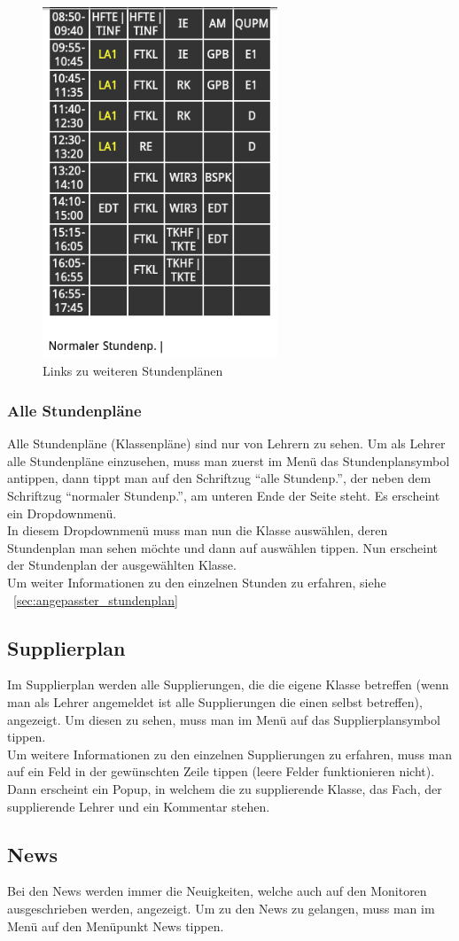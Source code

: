 \begin{figure}[H]
\centering
\includegraphics[keepaspectratio=true, width=7cm]{images/app_instructions/appTimetBottom.png}
\caption{Links zu weiteren Stundenplänen}
\label{fig:App_Timetable_Bottom}
\end{figure}

\subsubsection{Alle Stundenpläne}
Alle Stundenpläne (Klassenpläne) sind nur von Lehrern zu sehen. Um als Lehrer alle Stundenpläne einzusehen, muss man zuerst im Menü das Stundenplansymbol antippen, dann tippt man auf den Schriftzug \enquote{alle Stundenp.}, der neben dem Schriftzug \enquote{normaler Stundenp.}, am unteren Ende der Seite steht. Es erscheint ein Dropdownmenü.\\
In diesem Dropdownmenü muss man nun die Klasse auswählen, deren Stundenplan man sehen möchte und dann auf auswählen tippen. Nun erscheint der Stundenplan der ausgewählten Klasse.\\
Um weiter Informationen zu den einzelnen Stunden zu erfahren, siehe ~\ref{sec:angepasster_stundenplan}

\subsection{Supplierplan}
Im Supplierplan werden alle Supplierungen, die die eigene Klasse betreffen (wenn man als Lehrer angemeldet ist alle Supplierungen die einen selbst betreffen), angezeigt. Um diesen zu sehen, muss man im Menü auf das Supplierplansymbol tippen.\\
Um weitere Informationen zu den einzelnen Supplierungen zu erfahren, muss man auf ein Feld in der gewünschten Zeile tippen (leere Felder funktionieren nicht). Dann erscheint ein Popup, in welchem die zu supplierende Klasse, das Fach, der supplierende Lehrer und ein Kommentar stehen.

\subsection{News}
Bei den News werden immer die Neuigkeiten, welche auch auf den Monitoren ausgeschrieben werden,  angezeigt. Um zu den News zu gelangen, muss man im Menü auf den Menüpunkt News tippen.
